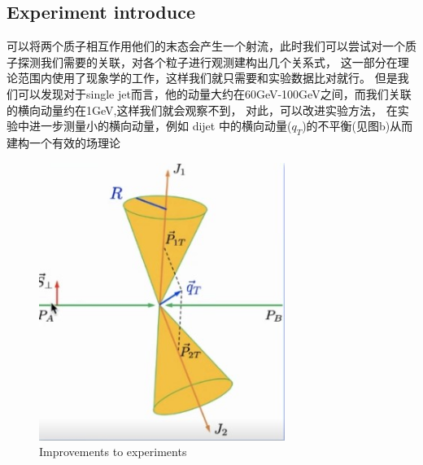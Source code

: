 \documentclass[12pt, a4paper, oneside]{ctexart}
\begin{document}
\begin{spacing}{2.0}
\subsection{Experiment introduce}
可以将两个质子相互作用他们的末态会产生一个射流，此时我们可以尝试对一个质子探测我们需要的关联，对各个粒子进行观测建构出几个关系式，
这一部分在理论范围内使用了现象学的工作，这样我们就只需要和实验数据比对就行。
但是我们可以发现对于single jet而言，他的动量大约在60GeV-100GeV之间，而我们关联的横向动量约在1GeV,这样我们就会观察不到，
对此，可以改进实验方法，
在实验中进一步测量小的横向动量，例如 dijet 中的横向动量($q_T$)的不平衡(见图b)从而建构一个有效的场理论
\begin{figure}
    \centering
    \includegraphics[width=8cm]{delta.jpg}
    \caption{Improvements to experiments}    
\end{figure}


\end{spacing}
\end{document}
